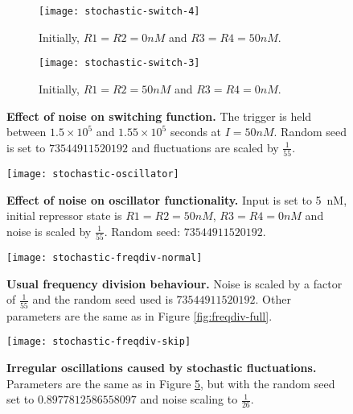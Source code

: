     \begin{figure}[!htb]
      \centering
      \begin{subfigure}[t]{0.8\textwidth}
        \centering
        \texttt{[image: stochastic-switch-4]}
        \caption{Initially, $R1 = R2 = 0nM$ and $R3 = R4 = 50nM$.}
        \label{fig:stochastic-switch-4}
      \end{subfigure}
      \begin{subfigure}[t]{0.8\textwidth}
        \centering
        \texttt{[image: stochastic-switch-3]}
        \caption{Initially, $R1 = R2 = 50nM$ and $R3 = R4 = 0nM$.}
        \label{fig:stochastic-switch-3}
      \end{subfigure}
      \caption{\textbf{Effect of noise on switching function.} The trigger is held between $1.5 \times 10^5$ and $1.55 \times 10^5$ seconds at $I = 50 nM$. Random seed is set to $73544911520192$ and fluctuations are scaled by $\frac{1}{55}$.}
      \label{fig:stochastic-switch}
    \end{figure}

    \begin{figure}[!htb]
      \centering
      \texttt{[image: stochastic-oscillator]}
      \caption{\textbf{Effect of noise on oscillator functionality.} Input is set to \SI{5}{\nano M}, initial repressor state is $R1 = R2 = 50nM$, $R3 = R4 = 0nM$ and noise is scaled by $\frac{1}{55}$. Random seed: $73544911520192$.}
      \label{fig:stochastic-oscillator}
    \end{figure}

    \begin{figure}[!htb]
      \centering
      \texttt{[image: stochastic-freqdiv-normal]}
      \caption{\textbf{Usual frequency division behaviour.} Noise is scaled by a factor of $\frac{1}{55}$ and the random seed used is $73544911520192$. Other parameters are the same as in Figure \ref{fig:freqdiv-full}.}
      \label{fig:stochastic-freqdiv-normal}
    \end{figure}
    \begin{figure}[!htb]
      \centering
      \texttt{[image: stochastic-freqdiv-skip]}
      \caption{\textbf{Irregular oscillations caused by stochastic fluctuations.} Parameters are the same as in Figure \ref{fig:stochastic-freqdiv-normal}, but with the random seed set to $0.8977812586558097$ and noise scaling to $\frac{1}{26}$.}
      \label{fig:stochastic-freqdiv-skip}
    \end{figure}

